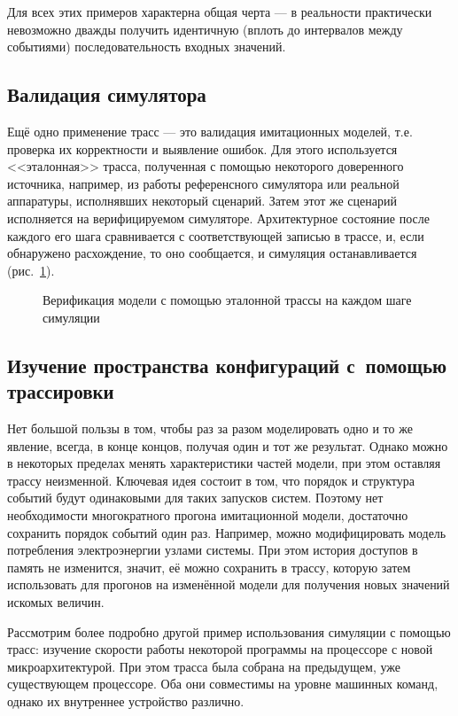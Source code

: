 Для всех этих примеров характерна общая черта --- в реальности практически невозможно дважды получить идентичную (вплоть до интервалов между событиями) последовательность входных значений. 

\subsection{Валидация симулятора}
Ещё одно применение трасс --- это валидация имитационных моделей, т.е. проверка их корректности и выявление ошибок. Для этого используется <<эталонная>> трасса, полученная с помощью некоторого доверенного источника, например, из работы референсного симулятора или реальной аппаратуры, исполнявших некоторый сценарий. Затем этот же сценарий исполняется на верифицируемом симуляторе. Архитектурное состояние после каждого его шага сравнивается с соответствующей записью в трассе, и, если обнаружено расхождение, то оно сообщается, и симуляция останавливается (рис.~\ref{fig:trace-verification}).

\begin{figure}[htp]
    \centering
    \caption[Верификация симулятора с помощью эталонной трассы]{Верификация модели с помощью эталонной трассы на каждом шаге симуляции}
    \label{fig:trace-verification}
\end{figure}

\subsection[Изучение пространства конфигураций]{Изучение пространства конфигураций с~помощью трассировки}

Нет большой пользы в том, чтобы раз за разом моделировать одно и то же явление, всегда, в конце концов, получая один и тот же результат. Однако можно в некоторых пределах менять характеристики частей модели, при этом оставляя трассу неизменной. Ключевая идея состоит в том, что порядок и структура событий будут одинаковыми для таких запусков систем. Поэтому нет необходимости многократного прогона имитационной модели, достаточно сохранить порядок событий один раз. Например, можно модифицировать модель потребления электроэнергии узлами системы. При этом история доступов в память не изменится, значит, её можно сохранить в трассу, которую затем использовать для прогонов на изменённой модели для получения новых значений искомых величин.

Рассмотрим более подробно другой пример использования  симуляции с помощью трасс: изучение скорости работы некоторой программы на процессоре с новой микроархитектурой. При этом трасса была собрана на предыдущем, уже существующем процессоре. Оба они совместимы на уровне машинных команд, однако их внутреннее устройство различно. 


